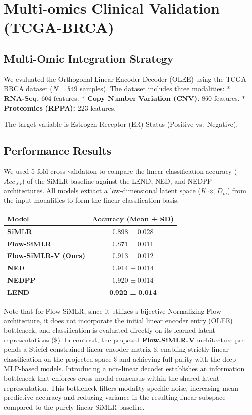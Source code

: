 \documentclass[
  letterpaper,
]{report}
\newcounter{none} %
\begin{document}
\chapter{Multi-omics Clinical Validation
(TCGA-BRCA)}\label{multi-omics-clinical-validation-tcga-brca}

\section{Multi-Omic Integration
Strategy}\label{multi-omic-integration-strategy}

We evaluated the Orthogonal Linear Encoder-Decoder (OLEE) using the
TCGA-BRCA dataset (\(N=549\) samples). The dataset includes three
modalities: * \textbf{RNA-Seq:} 604 features. * \textbf{Copy Number
Variation (CNV):} 860 features. * \textbf{Proteomics (RPPA):} 223
features.

The target variable is Estrogen Receptor (ER) Status (Positive
vs.~Negative).

\section{Performance Results}\label{performance-results}

We used 5-fold cross-validation to compare the linear classification
accuracy (\(Acc_{XV}\)) of the SiMLR baseline against the LEND, NED, and
NEDPP architectures. All models extract a low-dimensional latent space
(\(K \ll D_m\)) from the input modalities to form the linear
classification basis.

{\def\LTcaptype{none} %
\begin{longtable}[]{@{}lc@{}}
\toprule\noalign{}
Model & Accuracy (Mean ± SD) \\
\midrule\noalign{}
\endhead
\bottomrule\noalign{}
\endlastfoot
\textbf{SiMLR} & 0.898 ± 0.028 \\
\textbf{Flow-SiMLR} & 0.871 ± 0.011 \\
\textbf{Flow-SiMLR-V (Ours)} & 0.913 ± 0.012 \\
\textbf{NED} & 0.914 ± 0.014 \\
\textbf{NEDPP} & 0.920 ± 0.014 \\
\textbf{LEND} & \textbf{0.922 ± 0.014} \\
\end{longtable}
}

Note that for Flow-SiMLR, since it utilizes a bijective Normalizing Flow
architecture, it does not incorporate the initial linear encoder entry
(OLEE) bottleneck, and classification is evaluated directly on its
learned latent representations (\$). In contrast, the proposed
\textbf{Flow-SiMLR-V} architecture pre-pends a Stiefel-constrained
linear encoder matrix \$, enabling strictly linear classification on the
projected space \$ and achieving full parity with the deep MLP-based
models. Introducing a non-linear decoder establishes an information
bottleneck that enforces cross-modal consensus within the shared latent
representation. This bottleneck filters modality-specific noise,
increasing mean predictive accuracy and reducing variance in the
resulting linear subspace compared to the purely linear SiMLR baseline.
\end{document}
